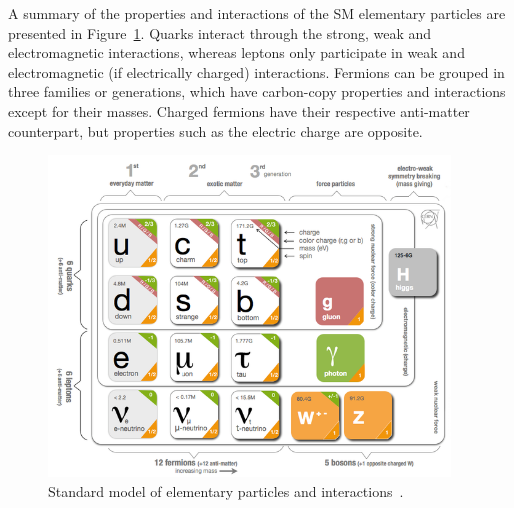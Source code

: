 A summary of the properties and interactions of the SM elementary particles are presented in Figure~\ref{fig:sm}. Quarks interact through the strong, weak and electromagnetic interactions, whereas leptons only participate in weak and electromagnetic (if electrically charged) interactions. Fermions can be grouped in three families or generations, which have carbon-copy properties and interactions except for their masses. Charged fermions have their respective anti-matter counterpart, but properties such as the electric charge are opposite. 

\begin{figure}[ht!]
\centering
\includegraphics[width=0.95\textwidth]{Figures/HiggsPairProduction/sm.png}
\caption[Standard Model of elementary particles and interactions]{Standard model of elementary particles and interactions~\cite{Purcell:1473657}.}
\label{fig:sm}
\end{figure}

